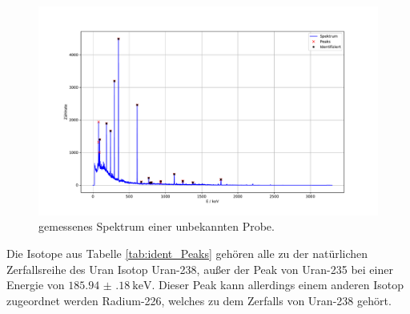 \begin{figure}
  \centering
  \caption{gemessenes Spektrum einer unbekannten Probe.}
  \label{fig:Peaks_04}
  \includegraphics[width=\textwidth,keepaspectratio]{figure/04_peaks.pdf}
\end{figure}
\FloatBarrier
Die Isotope aus Tabelle \ref{tab:ident_Peaks} gehören alle zu der natürlichen Zerfallsreihe des Uran Isotop Uran-238, 
außer der Peak von Uran-235 bei einer Energie von $\SI{185.94(18)}{\kilo\eV}$. Dieser Peak kann allerdings einem anderen 
Isotop zugeordnet werden Radium-226, welches zu dem Zerfalls von Uran-238 gehört.








